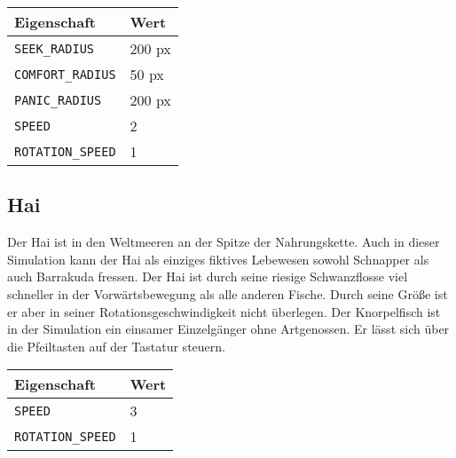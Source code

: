 \documentclass[11pt]{article}
\begin{document}
\begin{tabular}{|l|l|}
\hline
	\textbf{Eigenschaft} & \textbf{Wert}\\
\hline
\hline
	\lstinline[]$SEEK_RADIUS$  & 200 px\\
\hline
	\lstinline[]$COMFORT_RADIUS$ & 50 px\\
\hline
	\lstinline[]$PANIC_RADIUS$ & 200 px\\
\hline
	\lstinline[]$SPEED$ & 2\\
\hline
	\lstinline[]$ROTATION_SPEED$ & 1\\
\hline
\end{tabular}

\subsection{Hai}
Der Hai ist in den Weltmeeren an der Spitze der Nahrungskette. Auch in dieser Simulation kann der Hai als einziges fiktives Lebewesen sowohl Schnapper als auch Barrakuda fressen. Der Hai ist durch seine riesige Schwanzflosse viel schneller in der Vorwärtsbewegung als alle anderen Fische. Durch seine Größe ist er aber in seiner Rotationsgeschwindigkeit nicht überlegen. Der Knorpelfisch ist in der Simulation ein einsamer Einzelgänger ohne Artgenossen. Er lässt sich über die Pfeiltasten auf der Tastatur steuern.\\

\begin{tabular}{|l|l|}
\hline
	\textbf{Eigenschaft} & \textbf{Wert}\\
\hline
\hline
	\lstinline[]$SPEED$ & 3\\
\hline
	\lstinline[]$ROTATION_SPEED$ & 1\\
\hline
\end{tabular}
\end{document}
